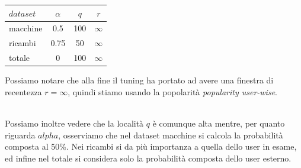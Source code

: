 \begin{minipage}[H]{0.45\textwidth}
    \begin{center}

        \begin{tabular}{|l|ccc|}
            \toprule
            $dataset$ &    $\alpha$ &  $q$ & $r$ \\
            \midrule
            macchine & 0.5 & 100 & $\infty$ \\
            ricambi  &	0.75 & 50 & $\infty$ \\
            totale  & 0 & 100 & $\infty$ \\
        \bottomrule
        \end{tabular}
        \label{tab:next_basket_tuning}
    \end{center}
\end{minipage}
\begin{minipage}[H]{0.55\textwidth}
    Possiamo notare che alla fine il tuning ha portato ad avere una finestra di recentezza  $r = \infty$, quindi stiamo usando la popolarità \textit{popularity user-wise}. 
\end{minipage}\\

Possiamo inoltre vedere che la località $q$ è comunque alta mentre, per quanto riguarda $alpha$, osserviamo che nel dataset macchine si calcola la probabilità composta al 50\%. Nei ricambi si da più importanza a quella dello user in esame, ed infine nel totale si considera solo la probabilità composta dello user esterno.

